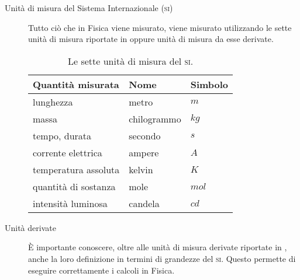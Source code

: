 \documentclass[a4paper,11pt,italian]{article}
\begin{document}
\begin{description}
  \item[Unità di misura del Sistema Internazionale (\textsc{si})]
  Tutto ciò che in Fisica viene misurato, viene misurato utilizzando le sette unità di misura riportate in  oppure unità di misura da esse derivate.
  \begin{table}[htp]\centering
  \begin{tabular}{lll}\toprule
    \textbf{Quantità misurata} & \textbf{Nome} & \textbf{Simbolo} \\\midrule
    lunghezza & metro & $ m $ \\
    massa & chilogrammo & $ kg $ \\
    tempo, durata & secondo & $ s $ \\
    corrente elettrica  & ampere & $ A $ \\
    temperatura assoluta & kelvin & $ K $ \\
    quantità di sostanza & mole & $ mol $ \\
    intensità luminosa & candela & $ cd $ \\\bottomrule
  \end{tabular}
  \caption{Le sette unità di misura del \textsc{si}.}
  \label{tab:udmSI}
  \end{table}
 
 \item[Unità derivate]
 È importante conoscere, oltre alle unità di misura derivate riportate in , anche la loro definizione in termini di grandezze del \textsc{si}. Questo permette di eseguire correttamente i calcoli in Fisica.
 

\end{description}
\end{document}
